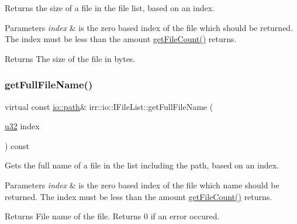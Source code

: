 Returns the size of a file in the file list, based on an index. 


\begin{DoxyParams}{Parameters}
{\em index} & is the zero based index of the file which should be returned. The index must be less than the amount \hyperlink{classirr_1_1io_1_1IFileList_a871861be76e18d58274c4580b1d103b9}{get\+File\+Count()} returns. \\
\hline
\end{DoxyParams}
\begin{DoxyReturn}{Returns}
The size of the file in bytes. 
\end{DoxyReturn}
\mbox{\label{classirr_1_1io_1_1IFileList_a063c823f58019bda79efabefabe365da}} 
\subsubsection{\texorpdfstring{get\+Full\+File\+Name()}{getFullFileName()}}
{\footnotesize\ttfamily virtual const \hyperlink{namespaceirr_1_1io_ab1bdc45edb3f94d8319c02bc0f840ee1}{io\+::path}\& irr\+::io\+::\+I\+File\+List\+::get\+Full\+File\+Name (\begin{DoxyParamCaption}\item[{\hyperlink{namespaceirr_a0416a53257075833e7002efd0a18e804}{u32}}]{index }\end{DoxyParamCaption}) const\hspace{0.3cm}{\ttfamily [pure virtual]}}



Gets the full name of a file in the list including the path, based on an index. 


\begin{DoxyParams}{Parameters}
{\em index} & is the zero based index of the file which name should be returned. The index must be less than the amount \hyperlink{classirr_1_1io_1_1IFileList_a871861be76e18d58274c4580b1d103b9}{get\+File\+Count()} returns. \\
\hline
\end{DoxyParams}
\begin{DoxyReturn}{Returns}
File name of the file. Returns 0 if an error occured. 
\end{DoxyReturn}
\mbox{\label{classirr_1_1io_1_1IFileList_a9f633344aa2bb36f619d1ca8472b46b6}} 
